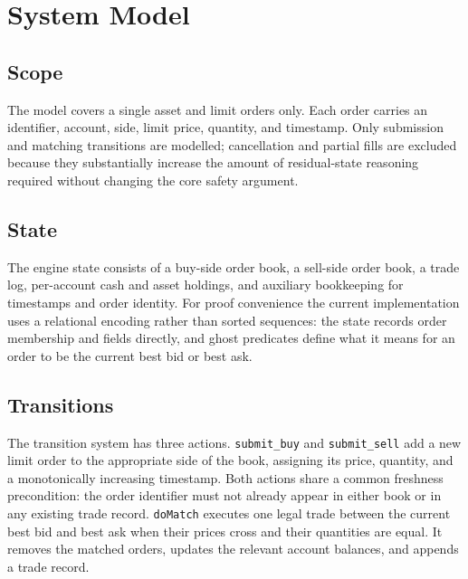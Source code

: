 \section{System Model}

\subsection{Scope}

The model covers a single asset and limit orders only. Each order carries an
identifier, account, side, limit price, quantity, and timestamp. Only
submission and matching transitions are modelled; cancellation and partial
fills are excluded because they substantially increase the amount of
residual-state reasoning required without changing the core safety argument.

\subsection{State}

The engine state consists of a buy-side order book, a sell-side order book, a
trade log, per-account cash and asset holdings, and auxiliary bookkeeping for
timestamps and order identity. For proof convenience the current
implementation uses a relational encoding rather than sorted sequences: the
state records order membership and fields directly, and ghost predicates
define what it means for an order to be the current best bid or best ask.

\subsection{Transitions}

The transition system has three actions. \texttt{submit\_buy} and
\texttt{submit\_sell} add a new limit order to the appropriate side of the
book, assigning its price, quantity, and a monotonically increasing timestamp.
Both actions share a common freshness precondition: the order identifier must
not already appear in either book or in any existing trade record.
\texttt{doMatch} executes one legal trade between the current best bid and
best ask when their prices cross and their quantities are equal. It removes
the matched orders, updates the relevant account balances, and appends a trade
record.
